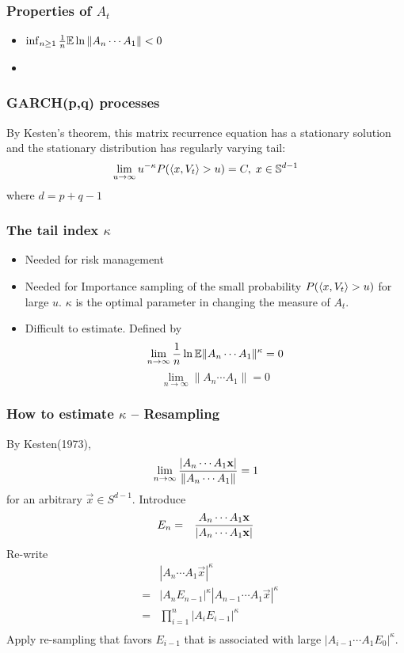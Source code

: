 \documentclass{beamer}
\begin{document}
  \begin{frame}
    \frametitle{Properties of $A_t$}
    \begin{itemize}
    \item $\inf_{n \geq 1} {1 \over n}\E \ln \|A_n \cdots A_1\| < 0$
    \item 
    \end{itemize}
  \end{frame}
  \begin{frame}
    \frametitle{GARCH(p,q) processes}
    By Kesten's  theorem, this matrix recurrence equation has a
    stationary solution and the stationary distribution has regularly
    varying tail:
    \[
    \lim_{u \to \infty} u^{-\kappa} P(\inn{x, V_t} > u) = C,\; x \in \mathbb S^{d-1}
    \]
    where $d = p + q -1$
  \end{frame}

  \begin{frame}
    \frametitle{The tail index $\kappa$}
    \begin{itemize}
    \item Needed for risk management
    \item Needed for Importance sampling of the small probability $P(\inn{x, V_t}
      > u)$ for large $u$. $\kappa$ is the optimal parameter in
      changing the measure of $A_t$.
    \item Difficult to estimate. Defined by
      \begin{equation*}
        \lim_{n \to \infty} {1 \over n} \ln \E \|A_n \cdots A_1\|^\kappa
        = 0
      \end{equation*}
      \begin{equation*}
        \lim_{n \to \infty} \|A_n \cdots A_1 \| = 0
      \end{equation*}
    \end{itemize}
  \end{frame}

 \begin{frame}
   \frametitle{How to estimate $\kappa$ -- Resampling}
    By Kesten(1973),
    \[
    \lim_{n \to \infty} {
      |A_n \cdots A_1 \vec{x}|
      \over
      \|A_n \cdots A_1\|
    } = 1
    \]
    for an arbitrary $\vec x \in S^{d-1}$. Introduce
    \begin{eqnarray*}
      E_n &=& {
        A_n \cdots A_1 \vec{x}
        \over
        |A_n \cdots A_1 \vec{x}|
      }
    \end{eqnarray*}
    Re-write
    \begin{eqnarray*}
      && |A_n \cdots A_1 \vec{x}|^\kappa      \\
      &=& |A_n E_{n-1}|^\kappa |A_{n-1} \cdots A_1 \vec{x}|^\kappa \\
      &=& \prod_{i=1}^n |A_i E_{i-1}|^\kappa \\
    \end{eqnarray*}
    Apply re-sampling that favors $E_{i-1}$ that is associated with
    large $| A_{i-1} \cdots A_1 E_0 |^\kappa$.
 \end{frame}
\end{document}
